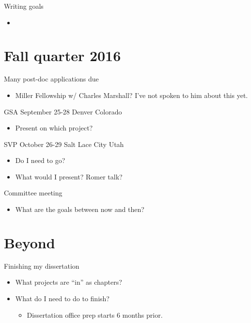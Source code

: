 \documentclass{article}
\begin{document}
Writing goals
\begin{itemize}
  \item 
\end{itemize}


\section{Fall quarter 2016}
Many post-doc applications due
\begin{itemize}
  \item Miller Fellowship w/ Charles Marshall? I've not spoken to him about this yet.
\end{itemize}

GSA September 25-28 Denver Colorado
\begin{itemize}
  \item Present on which project?
\end{itemize}

SVP October 26-29 Salt Lace City Utah
\begin{itemize}
  \item Do I need to go?
  \item What would I present? Romer talk?
\end{itemize}

Committee meeting
\begin{itemize}
  \item What are the goals between now and then?
\end{itemize}


\section{Beyond}
Finishing my dissertation
\begin{itemize}
  \item What projects are ``in'' as chapters?
  \item What do I need to do to finish?
    \begin{itemize}
      \item Dissertation office prep starts 6 months prior.
    \end{itemize}
\end{itemize}
\end{document}
